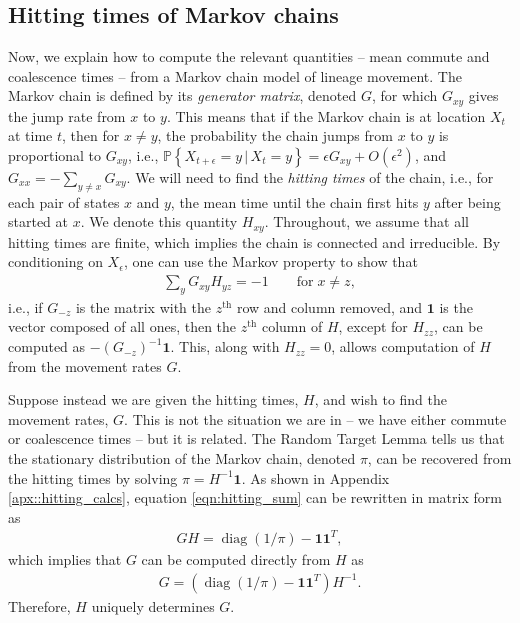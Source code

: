 \documentclass{article}
\DeclareMathOperator{\diag}{\mathop{\mbox{diag}}}
\renewcommand{\P}{\mathbb{P}}
\newcommand{\given}{\,\vert\,}
\newcommand{\PP}[1]{\P\!\left\{#1\right\}}
\newcommand{\bone}{\mathbf{1}}
\begin{document}
\subsection*{Hitting times of Markov chains}

Now, we explain how to compute the relevant quantities --
mean commute and coalescence times -- from a Markov chain model of lineage movement.
The Markov chain is defined by its \emph{generator matrix}, denoted $G$,
for which $G_{xy}$ gives the jump rate from $x$ to $y$.
This means that if the Markov chain is at location $X_t$ at time $t$,
then for $x \neq y$, the probability the chain jumps from $x$ to $y$ is proportional to $G_{xy}$,
i.e., $\PP{X_{t+\epsilon} = y \given X_t = y} = \epsilon G_{xy} + O(\epsilon^2)$,
and $G_{xx} = - \sum_{y \neq x} G_{xy}$.
We will need to find the \emph{hitting times} of the chain,
i.e., for each pair of states $x$ and $y$, 
the mean time until the chain first hits $y$ after being started at $x$.
We denote this quantity $H_{xy}$.
Throughout, we assume that all hitting times are finite,
which implies the chain is connected and irreducible.
By conditioning on $X_\epsilon$,
one can use the Markov property to show that
\begin{align} \label{eqn:hitting_sum}
    \sum_y G_{xy} H_{yz} = -1 \qquad \text{for} \; x \neq z,
\end{align}
i.e., if $G_{-z}$ is the matrix with the $z^\text{th}$ row and column removed,
and $\bone$ is the vector composed of all ones,
then the $z^\text{th}$ column of $H$, except for $H_{zz}$,
can be computed as $- (G_{-z})^{-1} \bone$.
This, along with $H_{zz} = 0$, allows computation of $H$
from the movement rates $G$.

Suppose instead we are given the hitting times, $H$, and wish to find the movement rates, $G$.
This is not the situation we are in -- we have either commute or coalescence times --
but it is related.
The Random Target Lemma \citep{aldous}
tells us that the stationary distribution of the Markov chain, denoted $\pi$,
can be recovered from the hitting times by solving $\pi = H^{-1} \bone$.
As shown in Appendix \ref{apx::hitting_calcs},
equation \eqref{eqn:hitting_sum} can be rewritten in matrix form as
\begin{align}
    G H = \diag(1/\pi) - \bone \bone^T ,
\end{align}
which implies that $G$ can be computed directly from $H$ as
\begin{align} \label{eqn:G_from_H}
    G = \left( \diag(1/\pi) - \bone \bone^T \right) H^{-1} .
\end{align}
Therefore, $H$ uniquely determines $G$.
\end{document}

